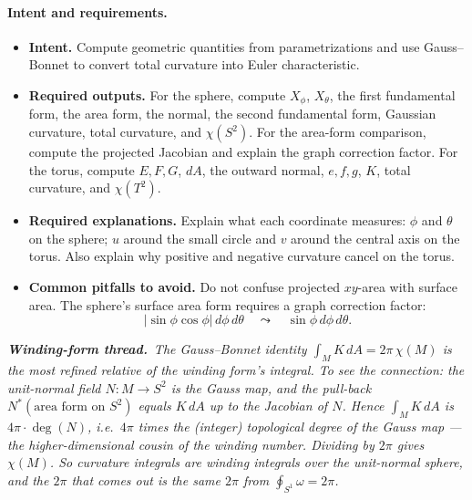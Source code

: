 \documentclass[11pt]{article}
\newcommand{\windingnote}[1]{%
\par\smallskip
\noindent\begin{minipage}{\linewidth}%
\color{windingblue}\small%
\textbf{\textit{Winding-form thread.}}\ \textit{#1}%
\end{minipage}\par\smallskip%
}
\newenvironment{intentrequirements}{%
\paragraph{Intent and requirements.}
\begin{itemize}[leftmargin=*, itemsep=0.25em]
}{%
\end{itemize}
}
\begin{document}
\begin{intentrequirements}
\item \textbf{Intent.} Compute geometric quantities from parametrizations and use Gauss--Bonnet to convert total curvature into Euler characteristic.
\item \textbf{Required outputs.} For the sphere, compute $X_\phi$, $X_\theta$, the first fundamental form, the area form, the normal, the second fundamental form, Gaussian curvature, total curvature, and $\chi(S^2)$. For the area-form comparison, compute the projected Jacobian and explain the graph correction factor. For the torus, compute $E,F,G$, $dA$, the outward normal, $e,f,g$, $K$, total curvature, and $\chi(T^2)$.
\item \textbf{Required explanations.} Explain what each coordinate measures: $\phi$ and $\theta$ on the sphere; $u$ around the small circle and $v$ around the central axis on the torus. Also explain why positive and negative curvature cancel on the torus.
\item \textbf{Common pitfalls to avoid.} Do not confuse projected $xy$-area with surface area. The sphere's surface area form requires a graph correction factor:
\[
 |\sin\phi\cos\phi|\,d\phi\,d\theta
 \quad\leadsto\quad
 \sin\phi\,d\phi\,d\theta.
\]
\end{intentrequirements}

\windingnote{The Gauss--Bonnet identity $\int_M K\,dA=2\pi\,\chi(M)$ is the most refined relative of the winding form's integral. To see the connection: the unit-normal field $N:M\to S^2$ is the Gauss map, and the pull-back $N^*(\text{area form on }S^2)$ equals $K\,dA$ up to the Jacobian of $N$. Hence $\int_M K\,dA$ is $4\pi\cdot\deg(N)$, i.e.\ $4\pi$ times the (integer) topological degree of the Gauss map --- the higher-dimensional cousin of the winding number. Dividing by $2\pi$ gives $\chi(M)$. So curvature integrals are \emph{winding integrals over the unit-normal sphere}, and the $2\pi$ that comes out is the same $2\pi$ from $\oint_{S^1}\omega=2\pi$.}
\end{document}
